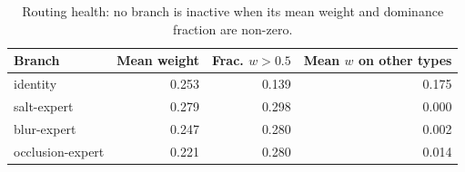 \begin{table}[t]
\centering
\caption{Routing health: no branch is inactive when its mean weight and dominance fraction are non-zero.}
\label{tab:t3_health}
\footnotesize
\begin{tabular}{lrrr}
\toprule
Branch & Mean weight & Frac. $w>0.5$ & Mean $w$ on other types \\
\midrule
identity & 0.253 & 0.139 & 0.175 \\
salt-expert & 0.279 & 0.298 & 0.000 \\
blur-expert & 0.247 & 0.280 & 0.002 \\
occlusion-expert & 0.221 & 0.280 & 0.014 \\
\bottomrule
\end{tabular}
\end{table}
